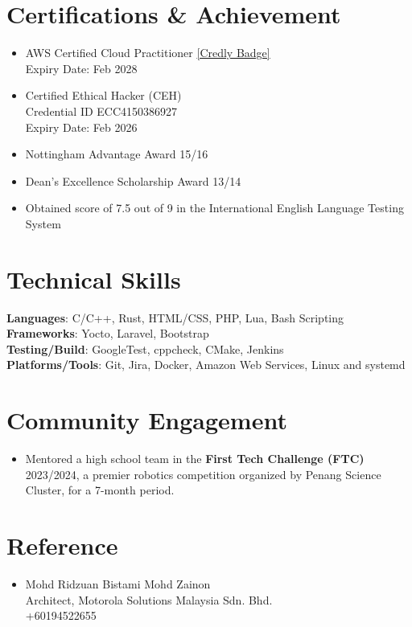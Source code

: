 \documentclass[a4paper,12pt]{article}
\begin{document}
\section{Certifications \& Achievement}
\vspace{3pt}
\begin{itemize}[leftmargin=*, itemsep=2pt, parsep=2pt] %
    \item AWS Certified Cloud Practitioner \href{https://www.credly.com/badges/225a84d5-6042-4071-9312-dc2a602fae62/linked_in_profile}{[Credly Badge]} \\
          Expiry Date: Feb 2028
    \item Certified Ethical Hacker (CEH) \\
          Credential ID ECC4150386927 \\
          Expiry Date: Feb 2026
    \item Nottingham Advantage Award 15/16
    \item Dean's Excellence Scholarship Award 13/14
    \item Obtained score of 7.5 out of 9 in the International English Language Testing System
\end{itemize}


\section{Technical Skills}
\vspace{3pt}
  \begin{itemize}[leftmargin=0.15in, label={}]
    \small{\item{
      \textbf{Languages}{: C/C++, Rust, HTML/CSS, PHP, Lua, Bash Scripting} \\
      \textbf{Frameworks}{: Yocto, Laravel, Bootstrap} \\
      \textbf{Testing/Build}{: GoogleTest, cppcheck, CMake, Jenkins} \\
      \textbf{Platforms/Tools}{: Git, Jira, Docker, Amazon Web Services, Linux and systemd} \\
    }}
  \end{itemize}

\section{Community Engagement}
\vspace{3pt}
\begin{itemize}
    \item Mentored a high school team in the \textbf{First Tech Challenge (FTC)} 2023/2024, a premier robotics competition organized by Penang Science Cluster, for a 7-month period.
\end{itemize}

\section{Reference}
  \begin{itemize}
    \item Mohd Ridzuan Bistami Mohd Zainon \\
          Architect, Motorola Solutions Malaysia Sdn. Bhd. \\
          +60194522655
  \end{itemize}
\end{document}
